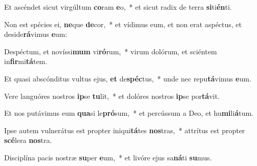 \item Et ascéndet sicut virgúltum \textbf{co}ram \textbf{e}o,~* et sicut radix de terra \textbf{si}ti\textbf{én}ti.
\item Non est spécies ei, \textbf{ne}que \textbf{de}cor,~* et vídimus eum, et non erat aspéctus, et deside\textbf{rá}vimus \textbf{e}um:
\item Despéctum, et novíssi\textbf{mum} vi\textbf{ró}rum,~* virum dolórum, et sciéntem in\textbf{fir}mi\textbf{tá}tem.
\item Et quasi abscónditus vultus ejus, \textbf{et} de\textbf{spéc}tus,~* unde nec repu\textbf{tá}vimus \textbf{e}um.
\item Vere languóres nostros \textbf{ip}se \textbf{tu}lit,~* et dolóres nostros \textbf{ip}se por\textbf{tá}vit.
\item Et nos putávimus eum \textbf{qua}si le\textbf{pró}sum,~* et percússum a Deo, et hu\textbf{mi}li\textbf{á}tum.
\item Ipse autem vulnerátus est propter iniqui\textbf{tá}tes \textbf{nos}tras,~* attrítus est propter \textbf{scé}lera \textbf{nos}tra.
\item Disciplína pacis nostræ \textbf{su}per \textbf{e}um,~* et livóre ejus sa\textbf{ná}ti \textbf{su}mus.
